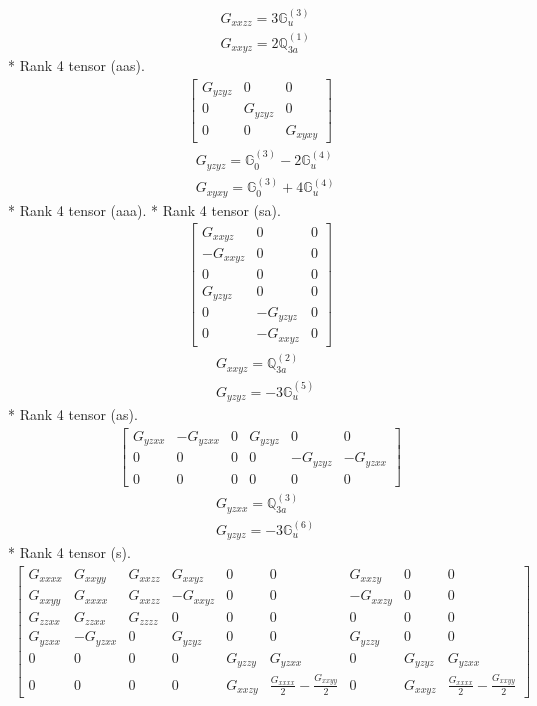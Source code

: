 \documentclass[fleqn,8pt,landscape]{jsarticle}
\begin{document}
\begin{align*}
& G_{xxzz} = 3 \mathbb{G}_{u}^{(3)} \\
& G_{xxyz} = 2 \mathbb{Q}_{3a}^{(1)}
\end{align*}
* Rank 4 tensor (aas).
\begin{align*}
\begin{bmatrix} G_{yzyz} & 0 & 0 \\ 0 & G_{yzyz} & 0 \\ 0 & 0 & G_{xyxy} \end{bmatrix}
\end{align*}
\begin{align*}
& G_{yzyz} = \mathbb{G}_{0}^{(3)} - 2 \mathbb{G}_{u}^{(4)} \\
& G_{xyxy} = \mathbb{G}_{0}^{(3)} + 4 \mathbb{G}_{u}^{(4)}
\end{align*}
* Rank 4 tensor (aaa).
* Rank 4 tensor (sa).
\begin{align*}
\begin{bmatrix} G_{xxyz} & 0 & 0 \\ - G_{xxyz} & 0 & 0 \\ 0 & 0 & 0 \\ G_{yzyz} & 0 & 0 \\ 0 & - G_{yzyz} & 0 \\ 0 & - G_{xxyz} & 0 \end{bmatrix}
\end{align*}
\begin{align*}
& G_{xxyz} = \mathbb{Q}_{3a}^{(2)} \\
& G_{yzyz} = - 3 \mathbb{G}_{u}^{(5)}
\end{align*}
* Rank 4 tensor (as).
\begin{align*}
\begin{bmatrix} G_{yzxx} & - G_{yzxx} & 0 & G_{yzyz} & 0 & 0 \\ 0 & 0 & 0 & 0 & - G_{yzyz} & - G_{yzxx} \\ 0 & 0 & 0 & 0 & 0 & 0 \end{bmatrix}
\end{align*}
\begin{align*}
& G_{yzxx} = \mathbb{Q}_{3a}^{(3)} \\
& G_{yzyz} = - 3 \mathbb{G}_{u}^{(6)}
\end{align*}
* Rank 4 tensor (s).
\begin{align*}
\begin{bmatrix} G_{xxxx} & G_{xxyy} & G_{xxzz} & G_{xxyz} & 0 & 0 & G_{xxzy} & 0 & 0 \\ G_{xxyy} & G_{xxxx} & G_{xxzz} & - G_{xxyz} & 0 & 0 & - G_{xxzy} & 0 & 0 \\ G_{zzxx} & G_{zzxx} & G_{zzzz} & 0 & 0 & 0 & 0 & 0 & 0 \\ G_{yzxx} & - G_{yzxx} & 0 & G_{yzyz} & 0 & 0 & G_{yzzy} & 0 & 0 \\ 0 & 0 & 0 & 0 & G_{yzzy} & G_{yzxx} & 0 & G_{yzyz} & G_{yzxx} \\ 0 & 0 & 0 & 0 & G_{xxzy} & \frac{G_{xxxx}}{2} - \frac{G_{xxyy}}{2} & 0 & G_{xxyz} & \frac{G_{xxxx}}{2} - \frac{G_{xxyy}}{2} \end{bmatrix}
\end{align*}
\end{document}
